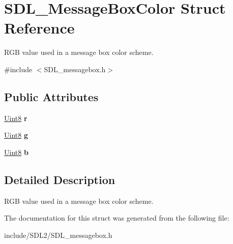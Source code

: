 \hypertarget{struct_s_d_l___message_box_color}{}\section{S\+D\+L\+\_\+\+Message\+Box\+Color Struct Reference}
\label{struct_s_d_l___message_box_color}


R\+GB value used in a message box color scheme.  




{\ttfamily \#include $<$S\+D\+L\+\_\+messagebox.\+h$>$}

\subsection*{Public Attributes}
\begin{DoxyCompactItemize}
\item 
\mbox{\label{struct_s_d_l___message_box_color_a43ab2172c10058380fcf67ecc3f53184}} 
\hyperlink{_s_d_l__stdinc_8h_a2944638813a090aa23e62f4da842c3e2}{Uint8} {\bfseries r}
\item 
\mbox{\label{struct_s_d_l___message_box_color_a5820adab0b32aa3eade101ea36ed6b4a}} 
\hyperlink{_s_d_l__stdinc_8h_a2944638813a090aa23e62f4da842c3e2}{Uint8} {\bfseries g}
\item 
\mbox{\label{struct_s_d_l___message_box_color_ad1215a42167cb5b190ff8f19dbd42066}} 
\hyperlink{_s_d_l__stdinc_8h_a2944638813a090aa23e62f4da842c3e2}{Uint8} {\bfseries b}
\end{DoxyCompactItemize}


\subsection{Detailed Description}
R\+GB value used in a message box color scheme. 

The documentation for this struct was generated from the following file\+:\begin{DoxyCompactItemize}
\item 
include/\+S\+D\+L2/S\+D\+L\+\_\+messagebox.\+h\end{DoxyCompactItemize}
